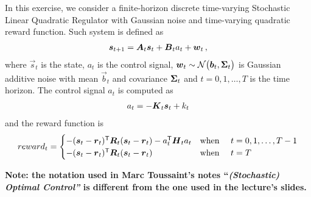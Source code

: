 In this exercise, we consider a finite-horizon discrete time-varying Stochastic Linear Quadratic Regulator with Gaussian noise and time-varying quadratic reward function. Such system is defined as
%
\begin{align}
	{\boldsymbol{s}}_{t+1} = {\boldsymbol{A}}_t {\boldsymbol{s}}_t + {\boldsymbol{B}}_t a_t + {\boldsymbol{w}}_t\,, 
\end{align}
where $\vec s_t$ is the state, $a_t$ is the control signal, ${\boldsymbol{w}}_t \sim \mathcal{N}\big({\boldsymbol{b}}_t,{\boldsymbol{\Sigma}}_t\big)$ is Gaussian additive noise with mean $\vec b_t$ and covariance ${\boldsymbol{\Sigma}}_t$ and $t=0,1,\dots,T$ is the time horizon. 
The control signal $a_t$ is computed as
%
\begin{align}
	a_t = - {\boldsymbol{K}}_t {\boldsymbol{s}}_t + k_t
\end{align}
%
and the reward function is
%
\begin{align}
	reward_t = \begin{cases}
	- ({\boldsymbol{s}}_t - {\boldsymbol{r}}_t)^\mathsf{T} {\boldsymbol{R}}_t ({\boldsymbol{s}}_t - {\boldsymbol{r}}_t) - a^\mathsf{T}_t {\boldsymbol{H}}_t a_t  & \text{when \quad} t=0,1,\dots,T-1
	\\
	- ({\boldsymbol{s}}_t - {\boldsymbol{r}}_t)^\mathsf{T} {\boldsymbol{R}}_t ({\boldsymbol{s}}_t - {\boldsymbol{r}}_t) & \text{when \quad} t=T
	\end{cases}
\end{align}
	
\textbf{Note: the notation used in Marc Toussaint's notes ``\textit{(Stochastic) Optimal Control''} is different from the one used in the lecture's slides.}	
	
